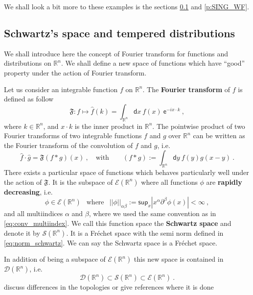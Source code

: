 \documentclass[11pt]{book}
\newcommand{\hilight}[1]{\colorbox{yellow!80!black}{#1}}
\renewcommand{\sup}{\mathsf{sup}}
\newcommand{\abs}[1]{\left|#1\right|}
\newcommand{\norm}[1]{\left|\left|#1\right|\right|}
\newcommand{\Dcal}{\mathcal{D}}
\newcommand{\Ecal}{\mathcal{E}}
\newcommand{\Scal}{\mathcal{S}}
\newcommand{\Rbb}{\mathbb{R}}
\newcommand{\Frak}{\mathfrak{F}}
\newcommand{\dsf}{\mathsf{d}}
\newcommand{\esf}{\mathsf{e}}
\theoremstyle{break}
\begin{document}
We shall look a bit more to these examples is the sections \ref{p:FOURIER} and \ref{p:SING_WF}.


\subsection{Schwartz's space and tempered distributions}
\label{p:FOURIER}


We shall introduce here the concept of Fourier transform for functions and distributions on $\Rbb^n$. We shall define a new space of functions which have ``good'' property under the action of Fourier transform.


\bigskip


Let us consider an integrable function $f$ on $\Rbb^n$. The \textbf{Fourier transform} of $f$ is defined as follow
%
\begin{equation*}
\Frak : f \mapsto  \hat{f}(k) = \int_{\Rbb^n} \dsf x \ f(x) \ \esf^{-i x \cdot k} \ , 
\end{equation*}
%
where $k \in \Rbb^n$, and $x \cdot k$ is the inner product in $\Rbb^n$. The pointwise product of two Fourier transforms of two integrable functions $f$ and $g$ over $\Rbb^n$ can be written as the Fourier transform of the convolution of $f$ and $g$, i.e.
%
\begin{equation*}
\hat{f} \cdot \hat{g} = \Frak( f \ast g )(x) \ , \quad \mbox{with} \qquad (f \ast g) := \int_{\Rbb^n} \dsf y \ f(y) g(x-y) \ . 
\end{equation*}
%
There exists a particular space of functions which behaves particularly well under the action of $\Frak$. It is the subspace of $\Ecal(\Rbb^n)$ where all functions $\phi$ are \textbf{rapidly decreasing}, i.e.
%
\begin{equation}
\phi \in \Ecal(\Rbb^n) \ \ \mbox{ where } \ \ \norm{\phi}_{\alpha\beta} := \sup_x \abs{x^\alpha \partial^\beta \phi(x)} < \infty \ ,
\label{eq:norm_schwartz}
\end{equation}
%
and all multiindices $\alpha$ and $\beta$, where we used the same convention as in \eqref{eq:conv_multiindex}. We call this function space the \textbf{Schwartz space} and denote it by $\Scal(\Rbb^n)$. It is a Fréchet space with the semi norm defined in \eqref{eq:norm_schwartz}. We can say the Schwartz space is a Fréchet space. 


In addition of being a subspace of $\Ecal(\Rbb^n)$ this new space is contained in $\Dcal(\Rbb^n)$, i.e.
%
\begin{equation*}
\Dcal(\Rbb^n) \subset \Scal(\Rbb^n) \subset \Ecal(\Rbb^n) \ .
\end{equation*}
%
\hilight{discuss differences in the topologies or give references where it is done}
\bigskip
\end{document}
